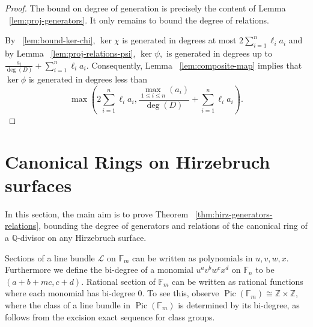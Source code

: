 \documentclass{amsart}
\theoremstyle{plain}
\theoremstyle{definition}
\theoremstyle{remark}
\numberwithin{equation}{section}
\newcommand\bq{{\mathbb Q}}
\newcommand\bz{{\mathbb Z}}
\newcommand\bida{a}
\newcommand\hirz{\mathbb{F}}
\DeclareMathOperator{\Pic}{Pic}
\begin{document}
\restateproj*

\begin{proof}
The bound on degree of generation is precisely the content of Lemma 
~\ref{lem:proj-generators}. It only remains to bound the degree of 
relations.

By ~\ref{lem:bound-ker-chi}, $\ker \chi$ is generated in degrees 
at most $2\sum_{i=1}^n \ell_i a_i$ and by Lemma
~\ref{lem:proj-relations-psi}, $\ker \psi,$ is generated in
degrees up to $\frac{\bida_i}{\deg(D)} + \sum_{i=1}^n \ell_i a_i$. 
Consequently, Lemma ~\ref{lem:composite-map} implies that $\ker \phi$
is generated in degrees less than
\[
	\max \left(2 \sum_{i=1}^n \ell_i a_i, \frac{\max_{1\le i \le n}
	(\bida_i)}{\deg(D)} + \sum_{i=1}^n \ell_i a_i \right).
\]
\end{proof}

\section{Canonical Rings on Hirzebruch surfaces}
\label{sec:hirz}
In this section, the main aim is to prove Theorem
~\ref{thm:hirz-generators-relations}, bounding the degree of
generators and relations of the canonical ring of a $\bq$-divisor
on any Hirzebruch surface.

Sections of a line bundle $\mathscr L$ on $\hirz_m$ can be written as
polynomials in $u,v, w,x$.
Furthermore we define the bi-degree of a monomial $u^a v^{b} w^c x^d$
on $\hirz_n$ to be
$(a + b + mc, c + d)$.  Rational section of $\hirz_m$ can be written as
rational functions where each monomial has bi-degree 0. To see this, 
observe
$\Pic(\hirz_m) \cong \bz \times \bz$, where the class of a line bundle
in $\Pic(\hirz_m)$
is determined by its bi-degree, as follows from the excision exact sequence
for class groups.
\end{document}

